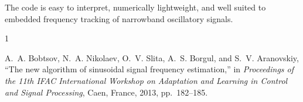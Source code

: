 \documentclass[conference]{IEEEtran}
\begin{document}
    The code is easy to interpret, numerically lightweight, and well suited to
    embedded frequency tracking of narrowband oscillatory signals.

    \begin{thebibliography}{1}

        A.~A. Bobtsov, N.~A. Nikolaev, O.~V. Slita, A.~S. Borgul, and
        S.~V. Aranovskiy,
        ``The new algorithm of sinusoidal signal frequency estimation,''
        in \emph{Proceedings of the 11th IFAC International Workshop on Adaptation
        and Learning in Control and Signal Processing}, Caen, France, 2013,
        pp.~182--185.

    \end{thebibliography}
\end{document}
